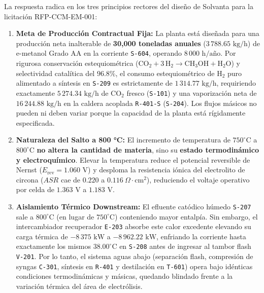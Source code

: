 \documentclass[11pt,letterpaper]{article}
\begin{document}
La respuesta radica en los tres principios rectores del diseño de Solvanta para la licitación RFP-CCM-EM-001:
\begin{enumerate}[itemsep=2pt, parsep=0pt, topsep=2pt]
    \item \textbf{Meta de Producción Contractual Fija:} La planta está diseñada para una producción neta inalterable de \textbf{30,000 toneladas anuales} ($3\,788.65\text{ kg/h}$) de e-metanol Grado AA en la corriente \texttt{S-604}, operando $8\,000\text{ h/año}$. Por rigurosa conservación estequiométrica ($\text{CO}_2 + 3\,\text{H}_2 \to \text{CH}_3\text{OH} + \text{H}_2\text{O}$) y selectividad catalítica del $96.8\%$, el consumo estequiométrico de $\text{H}_2$ puro alimentado a síntesis en \texttt{S-209} es estrictamente de \textbf{$1\,314.77\text{ kg/h}$}, requiriendo exactamente $5\,274.34\text{ kg/h}$ de $\text{CO}_2$ fresco (\texttt{S-101}) y una vaporización neta de $16\,244.88\text{ kg/h}$ en la caldera acoplada \texttt{R-401-S} (\texttt{S-204}). Los flujos másicos no pueden ni deben variar porque la capacidad de la planta está rígidamente especificada.
    \item \textbf{Naturaleza del Salto a 800 °C:} El incremento de temperatura de $750^\circ\text{C}$ a $800^\circ\text{C}$ \textbf{no altera la cantidad de materia}, sino su \textbf{estado termodinámico y electroquímico}. Elevar la temperatura reduce el potencial reversible de Nernst ($E_{\text{rev}} = 1.060\text{ V}$) y desploma la resistencia iónica del electrolito de circona ($ASR$ cae de $0.220$ a $0.116\ \Omega\cdot\text{cm}^2$), reduciendo el voltaje operativo por celda de $1.363\text{ V}$ a $1.183\text{ V}$.
    \item \textbf{Aislamiento Térmico Downstream:} El efluente catódico húmedo \texttt{S-207} sale a $800^\circ\text{C}$ (en lugar de $750^\circ\text{C}$) conteniendo mayor entalpía. Sin embargo, el intercambiador recuperador \texttt{E-203} absorbe este calor excedente elevando su carga térmica de $-8\,375\text{ kW}$ a $-8\,962.22\text{ kW}$, enfriando la corriente hasta exactamente los mismos \textbf{$38.00^\circ\text{C}$} en \texttt{S-208} antes de ingresar al tambor flash \texttt{V-201}. Por lo tanto, el sistema aguas abajo (separación flash, compresión de syngas \texttt{C-301}, síntesis en \texttt{R-401} y destilación en \texttt{T-601}) opera bajo idénticas condiciones termodinámicas y másicas, quedando blindado frente a la variación térmica del área de electrólisis.
\end{enumerate}
\end{document}
